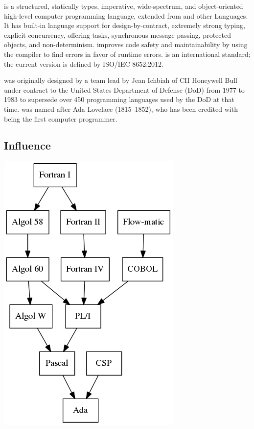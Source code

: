 \documentclass[../Languages.tex]{subfiles}
\begin{document}
\label{sec:ada}

 is a structured, statically types, imperative, wide-spectrum, and
object-oriented high-level computer programming language, extended from
 and other Languages. It has built-in language support for
design-by-contract, extremely strong typing, explicit concurrency, offering
tasks, synchronous message passing, protected objects, and non-determinism.
 improves code safety and maintainability by using the compiler to
find errors in favor of runtime errors.  is an international
standard; the current version is defined by ISO/IEC 8652:2012.

 was originally designed by a team lead by Jean Ichbiah of CII
Honeywell Bull under contract to the United States Department of Defense (DoD)
from 1977 to 1983 to supersede over 450 programming languages used by the DoD
at that time.  was named after Ada Lovelace (1815--1852), who has
been credited with being the first computer programmer.

\subsection{Influence}\label{sub:influence}

\begin{Figure}
  \centering
  \includegraphics[height=0.5\textheight]{ada}
\end{Figure}
\end{document}
